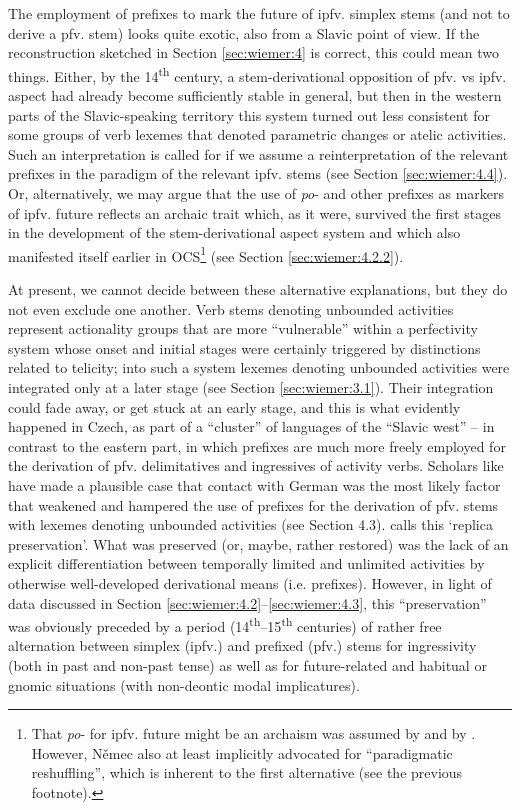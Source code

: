 \documentclass[output=paper,colorlinks,citecolor=brown]{langscibook}
\begin{document}
The employment of prefixes to mark the future of ipfv. simplex stems (and not to derive a pfv. stem) looks quite exotic, also from a Slavic point of view. If the reconstruction sketched in Section \ref{sec:wiemer:4} is correct, this could mean two things. Either, by the 14\textsuperscript{th} century, a stem\hyp{}derivational opposition of pfv. vs ipfv. aspect had already become sufficiently stable in general, but then in the western parts of the Slavic-speaking territory this system turned out less consistent for some groups of verb lexemes that denoted parametric changes or atelic activities. Such an interpretation is called for if we assume a reinterpretation of the relevant prefixes in the paradigm of the relevant ipfv. stems (see Section \ref{sec:wiemer:4.4}). Or, alternatively, we may argue that the use of \textit{po}- and other prefixes as markers of ipfv. future reflects an archaic trait which, as it were, survived the first stages in the development of the stem\hyp{}derivational aspect system and which also manifested itself earlier in OCS\footnote{That \textit{po}- for ipfv. future might be an archaism was assumed by \citet{Němec2009b} and by \citet[48]{Galton1976}. However, Němec also at least implicitly advocated for ``paradigmatic reshuffling'', which is inherent to the first alternative (see the previous footnote).} (see Section \ref{sec:wiemer:4.2.2}). 

At present, we cannot decide between these alternative explanations, but they do not even exclude one another. Verb stems denoting unbounded activities represent actionality groups that are more “vulnerable” within a perfectivity system whose onset and initial stages were certainly triggered by distinctions related to telicity; into such a system lexemes denoting unbounded activities were integrated only at a later stage (see Section \ref{sec:wiemer:3.1}). Their integration could fade away, or get stuck at an early stage, and this is what evidently happened in Czech, as part of a “cluster” of languages of the “Slavic west” – in contrast to the eastern part, in which prefixes are much more freely employed for the derivation of pfv. delimitatives and ingressives of activity verbs. Scholars like \citeauthor{Dickey2011} have made a plausible case that contact with German was the most likely factor that weakened and hampered the use of prefixes for the derivation of pfv. stems with lexemes denoting unbounded activities (see Section 4.3). \citet[]{Dickey2011} calls this ‘replica preservation’. What was preserved (or, maybe, rather restored) was the lack of an explicit differentiation between temporally limited and unlimited activities by otherwise well-developed derivational means (i.e. prefixes). However, in light of data discussed in Section \ref{sec:wiemer:4.2}--\ref{sec:wiemer:4.3}, this “preservation” was obviously preceded by a period (14\textsuperscript{th}--15\textsuperscript{th} centuries) of rather free alternation between simplex (ipfv.) and prefixed (pfv.) stems for ingressivity (both in past and non-past tense) as well as for future-related and habitual or gnomic situations (with non-deontic modal implicatures).
\end{document}
